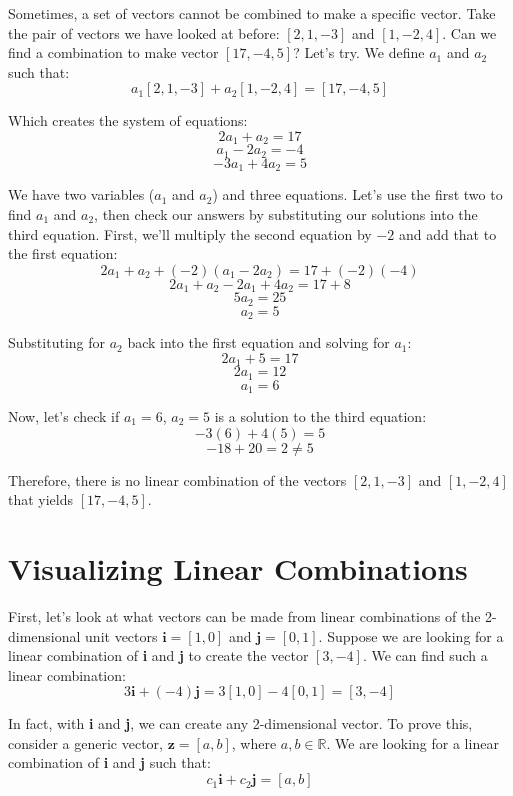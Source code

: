 Sometimes, a set of vectors cannot be combined to make a specific vector. Take 
the pair of vectors we have looked at before: $\left[ 2, 1, -3 \right]$ and 
$\left[ 1, -2, 4 \right]$. Can we find a combination to make vector $\left[ 
17, -4, 5 \right]$? Let's try. We define $a_1$ and $a_2$ such that:
$$a_1 \left[ 2, 1, -3 \right] + a_2 \left[ 1, -2, 4 \right] = \left[ 17, -4, 5 
\right]$$

Which creates the system of equations:
$$2 a_1 + a_2 = 17$$
$$a_1 - 2 a_2 = -4$$
$$-3 a_1 + 4 a_2 = 5$$

We have two variables ($a_1$ and $a_2$) and three equations. Let's use the 
first two to find $a_1$ and $a_2$, then check our answers by substituting our 
solutions into the third equation. First, we'll multiply the second equation 
by $-2$ and add that to the first equation:
$$2 a_1 + a_2 + \left( -2 \right) \left( a_1 - 2 a_2 \right) = 17 + \left( -2 
\right) \left( -4 \right)$$
$$2 a_1 + a_2 - 2 a_1 + 4 a_2 = 17 + 8$$
$$5 a_2 = 25$$
$$a_2 = 5$$

Substituting for $a_2$ back into the first equation and solving for $a_1$:
$$2 a_1 + 5 = 17$$
$$2 a_1 = 12$$
$$a_1 = 6$$

Now, let's check if $a_1 = 6$, $a_2 = 5$ is a solution to the third equation:
$$-3 \left( 6 \right) + 4 \left( 5 \right) = 5$$
$$-18 + 20 = 2 \neq 5$$

Therefore, there is no linear combination of the vectors $\left[ 2, 1, -3 
\right]$ and $\left[ 1, -2, 4 \right]$ that yields $\left[ 17, -4, 5 \right]$.

\section{Visualizing Linear Combinations}
First, let's look at what vectors can be made from linear combinations of the 
2-dimensional unit vectors $\textbf{i} = \left[ 1, 0 \right]$ and $\textbf{j} 
= \left[ 0, 1 \right]$. Suppose we are looking for a linear combination of 
\textbf{i} and \textbf{j} to create the vector $\left[ 3, -4 \right]$. We can 
find such a linear combination:
$$3\textbf{i} + \left( -4 \right) \textbf{j} = 3 \left[1, 0 \right] - 4 \left[ 
0, 1 \right] = \left[ 3, -4 \right]$$

In fact, with \textbf{i} and \textbf{j}, we can create any 2-dimensional 
vector. To prove this, consider a generic vector, $\textbf{z} = \left[ a, b 
\right]$, where $a, b \in \mathbb{R}$. We are looking for a linear combination 
of \textbf{i} and \textbf{j} such that:
$$c_1 \textbf{i} + c_2 \textbf{j} = \left[ a, b \right]$$

